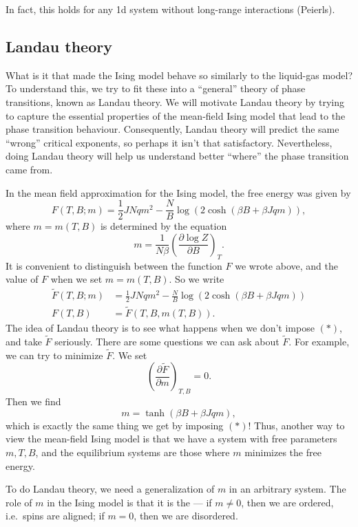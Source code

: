 \documentclass[a4paper]{article}
\begin{document}
In fact, this holds for any 1d system without long-range interactions (Peierls).

\subsection{Landau theory}
What is it that made the Ising model behave so similarly to the liquid-gas model? To understand this, we try to fit these into a ``general'' theory of phase transitions, known as Landau theory. We will motivate Landau theory by trying to capture the essential properties of the mean-field Ising model that lead to the phase transition behaviour. Consequently, Landau theory will predict the same ``wrong'' critical exponents, so perhaps it isn't that satisfactory. Nevertheless, doing Landau theory will help us understand better ``where'' the phase transition came from.

In the mean field approximation for the Ising model, the free energy was given by
\[
  F (T, B; m) = \frac{1}{2} JNqm^2 - \frac{N}{B} \log \left(2 \cosh (\beta B + \beta Jqm)\right),
\]
where $m = m(T, B)$ is determined by the equation
\[
  m = \frac{1}{N\beta} \left(\frac{\partial \log Z}{\partial B}\right)_T.\tag{$*$}
\]
It is convenient to distinguish between the function $F$ we wrote above, and the value of $F$ when we set $m = m(T, B)$. So we write
\begin{align*}
  \tilde{F} (T, B; m) &= \frac{1}{2} JNqm^2 - \frac{N}{B} \log \left(2 \cosh (\beta B + \beta Jqm)\right)\\
  F(T, B) &= \tilde{F}(T, B, m(T, B)).
\end{align*}
The idea of Landau theory is to see what happens when we don't impose $(*)$, and take $\tilde{F}$ seriously. There are some questions we can ask about $\tilde{F}$. For example, we can try to minimize $\tilde{F}$. We set
\[
  \left(\frac{\partial \tilde{F}}{\partial m}\right)_{T, B} = 0.
\]
Then we find
\[
  m = \tanh (\beta B + \beta Jqm),
\]
which is exactly the same thing we get by imposing $(*)$! Thus, another way to view the mean-field Ising model is that we have a system with free parameters $m, T, B$, and the equilibrium systems are those where $m$ minimizes the free energy.

To do Landau theory, we need a generalization of $m$ in an arbitrary system. The role of $m$ in the Ising model is that it is the  --- if $m \not= 0$, then we are ordered, i.e.\ spins are aligned; if $m = 0$, then we are disordered.
\end{document}
